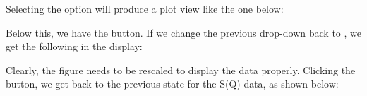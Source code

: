 Selecting the  option will produce a plot view like the one below:

\noindent{}

Below this, we have the  button. If we change the previous drop-down back to , we get the following in the display:

\noindent{}

Clearly, the figure needs to be rescaled to display the data properly. Clicking the  button, we get back to the previous state for the S(Q) data, as shown below:

\noindent{}

